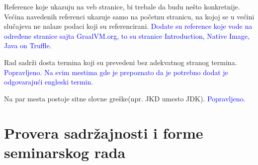 \documentclass[a4paper]{report}
\newcommand{\odgovor}[1]{\textcolor{blue}{#1}}
\begin{document}
\indent Reference koje ukazuju na veb stranice, bi trebale da budu nešto konkretnije. Većina navedenih referenci ukazuje samo na početnu stranicu, na kojoj se u većini slučajeva ne nalaze podaci koji su referencirani.  \odgovor{Dodate su reference koje vode na određene stranice sajta GraalVM.org, to su stranice Introduction, Native Image, Java on Truffle.}

\indent Rad sadrži dosta termina koji su prevedeni bez adekvatnog stranog termina. \odgovor{Popravljeno. Na svim mestima gde je prepoznato da je potrebno dodat je odgovarajući engleski termin.}

\indent Na par mesta postoje sitne slovne greške(npr. JKD umesto JDK). \odgovor{Popravljeno.}

\section{Provera sadržajnosti i forme seminarskog rada}
\end{document}
